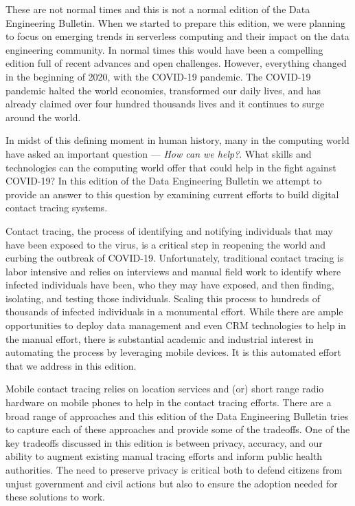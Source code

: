 \documentclass[11pt]{article}
\begin{document}
These are not normal times and this is not a normal edition of the Data Engineering Bulletin.  
When we started to prepare this edition, we were planning to focus on emerging trends in serverless computing and their impact on the data engineering community.  
In normal times this would have been a compelling edition full of recent advances and open challenges. 
However, everything changed in the beginning of 2020, with the COVID-19 pandemic. 
The COVID-19 pandemic halted the world economies, transformed our daily lives, and has already claimed over four hundred thousands lives and it continues to surge around the world.

In midst of this defining moment in human history, many in the computing world have asked an important question ---
\emph{How can we help?}.  
What skills and technologies can the computing world offer that could help in the fight against COVID-19?
In this edition of the Data Engineering Bulletin we attempt to provide an answer to this question by examining current efforts to build digital contact tracing systems. 


Contact tracing, the process of identifying and notifying individuals that may have been exposed to the virus, is a critical step in reopening the world and curbing the outbreak of COVID-19.  
Unfortunately, traditional  contact tracing is labor intensive and relies on interviews and manual field work to identify where infected individuals have been, who they may have exposed, and then finding, isolating, and testing those individuals.
Scaling this process to hundreds of thousands of infected individuals in a monumental effort. 
While there are ample opportunities to deploy data management and even CRM technologies to help in the manual effort, there is substantial academic and industrial interest in automating the process by leveraging mobile devices.
It is this automated effort that we address in this edition.


Mobile contact tracing relies on location services and (or) short range radio hardware on mobile phones to help in the contact tracing efforts.  
There are a broad range of approaches and this edition of the Data Engineering Bulletin tries to capture each of these approaches and provide some of the tradeoffs. 
One of the key tradeoffs discussed in this edition is between privacy, accuracy, and our ability to augment existing manual tracing efforts and inform public health authorities.  
The need to preserve privacy is critical both to defend citizens from unjust government and civil actions but also to ensure the adoption needed for these solutions to work.
\end{document}
